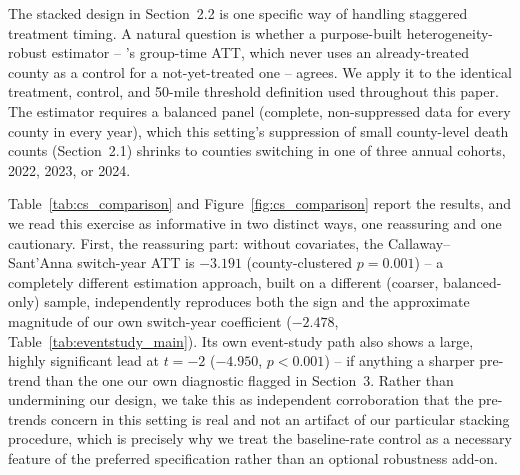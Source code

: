 \documentclass{article}
\begin{document}
The stacked design in Section~2.2 is one specific way of handling staggered treatment timing. A natural
question is whether a purpose-built heterogeneity-robust estimator -- \citet{CallawaySantAnna2021}'s
group-time ATT, which never uses an already-treated county as a control for a not-yet-treated one -- agrees.
We apply it to the identical treatment, control, and 50-mile threshold definition used throughout this paper.
The estimator requires a balanced panel (complete, non-suppressed data for every county in every year), which
this setting's suppression of small county-level death counts (Section~2.1) shrinks to counties switching in
one of three annual cohorts, 2022, 2023, or 2024.

Table~\ref{tab:cs_comparison} and Figure~\ref{fig:cs_comparison} report the results, and we read this exercise
as informative in two distinct ways, one reassuring and one cautionary. First, the reassuring part: without
covariates, the Callaway--Sant'Anna switch-year ATT is $-3.191$ (county-clustered $p=0.001$) -- a completely
different estimation approach, built on a different (coarser, balanced-only) sample, independently reproduces
both the sign and the approximate magnitude of our own switch-year coefficient ($-2.478$, Table~\ref{tab:eventstudy_main}).
Its own event-study path also shows a large, highly significant lead at $t=-2$ ($-4.950$, $p<0.001$) -- if
anything a sharper pre-trend than the one our own diagnostic flagged in Section~3. Rather than undermining our
design, we take this as independent corroboration that the pre-trends concern in this setting is real and not
an artifact of our particular stacking procedure, which is precisely why we treat the baseline-rate control as
a necessary feature of the preferred specification rather than an optional robustness add-on.
\end{document}
